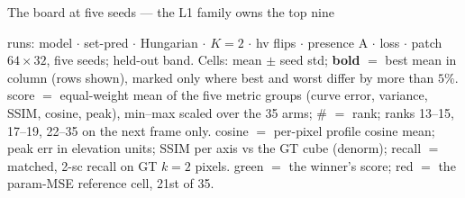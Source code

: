 \documentclass[aspectratio=169,9pt]{beamer}
\begin{document}
\begin{frame}{The board at five seeds --- the L1 family owns the top nine}
  \parbox{0.90\textwidth}{\tiny\color{soft} runs: model $\cdot$ set-pred $\cdot$ Hungarian $\cdot$
   $K{=}2$ $\cdot$ hv flips $\cdot$ presence A $\cdot$ loss $\cdot$ patch
   $64{\times}32$, five seeds; held-out band. Cells: mean $\pm$ seed std;
   \textbf{bold} $=$ best mean in column (rows shown), marked only where best and worst differ by more than $5\%$. score $=$ equal-weight mean
   of the five metric groups (curve error, variance, SSIM, cosine, peak), min--max
   scaled over the 35 arms; \# $=$ rank; ranks 13--15, 17--19, 22--35 on the next
   frame only. cosine $=$ per-pixel profile cosine mean; peak err in elevation
   units; SSIM per axis vs the GT cube (denorm); recall $=$ matched, 2-sc recall on GT $k{=}2$ pixels. \textcolor{good}{green} $=$ the winner's score; \textcolor{accent}{red} $=$ the param-MSE reference cell, 21st of 35.\par}
    

\end{frame}
\end{document}
